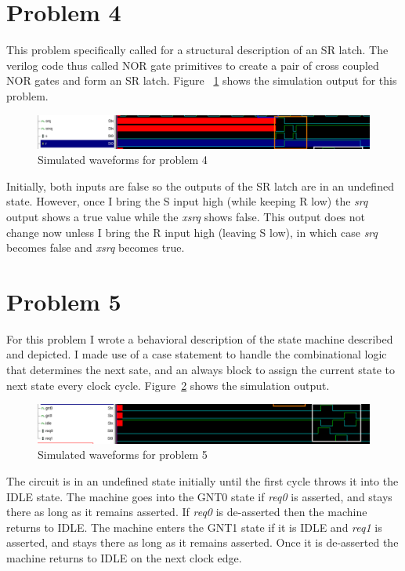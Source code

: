 \documentclass[fullpage]{article}
\begin{document}
\section*{Problem 4}

This problem specifically called for a structural description of an SR latch. The verilog code thus called NOR gate primitives to create a pair of cross coupled NOR gates and form an SR latch. Figure ~\ref{fig:p4} shows the simulation output for this problem.

\begin{figure}[ht!]
 	\includegraphics[scale=0.5,keepaspectratio=true]{../images/prob4.png}
 	\caption{Simulated waveforms for problem 4}
 	\label{fig:p4}
\end{figure}

Initially, both inputs are false so the outputs of the SR latch are in an undefined state. However, once I bring the S input high (while keeping R low) the \emph{srq} output shows a true value while the \emph{xsrq} shows false. This output does not change now unless I bring the R input high (leaving S low), in which case \emph{srq} becomes false and \emph{xsrq} becomes true.

\section*{Problem 5}

For this problem I wrote a behavioral description of the state machine described and depicted. I made use of a case statement to handle the combinational logic that determines the next sate, and an always block to assign the current state to next state every clock cycle. Figure~\ref{fig:p5} shows the simulation output.

\begin{figure}[ht!]
 	\includegraphics[scale=0.5,keepaspectratio=true]{../images/prob5.png}
 	\caption{Simulated waveforms for problem 5}
 	\label{fig:p5}
\end{figure}

The circuit is in an undefined state initially until the first cycle throws it into the IDLE state. The machine goes into the GNT0 state if \emph{req0} is asserted, and stays there as long as it remains asserted. If \emph{req0} is de-asserted then the machine returns to IDLE. The machine enters the GNT1 state if it is IDLE and \emph{req1} is asserted, and stays there as long as it remains asserted. Once it is de-asserted the machine returns to IDLE on the next clock edge.
\end{document}
